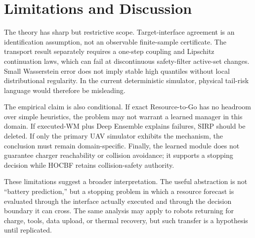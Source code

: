 \section{Limitations and Discussion}
\label{sec:limitations}

The theory has sharp but restrictive scope. Target-interface agreement is an identification assumption, not an observable finite-sample certificate. The transport result separately requires a one-step coupling and Lipschitz continuation laws, which can fail at discontinuous safety-filter active-set changes. Small Wasserstein error does not imply stable high quantiles without local distributional regularity. In the current deterministic simulator, physical tail-risk language would therefore be misleading.

The empirical claim is also conditional. If exact Resource-to-Go has no headroom over simple heuristics, the problem may not warrant a learned manager in this domain. If executed-WM plus Deep Ensemble explains failures, SIRP should be deleted. If only the primary UAV simulator exhibits the mechanism, the conclusion must remain domain-specific. Finally, the learned module does not guarantee charger reachability or collision avoidance; it supports a stopping decision while HOCBF retains collision-safety authority.

These limitations suggest a broader interpretation. The useful abstraction is not “battery prediction,” but a stopping problem in which a resource forecast is evaluated through the interface actually executed and through the decision boundary it can cross. The same analysis may apply to robots returning for charge, tools, data upload, or thermal recovery, but such transfer is a hypothesis until replicated.
